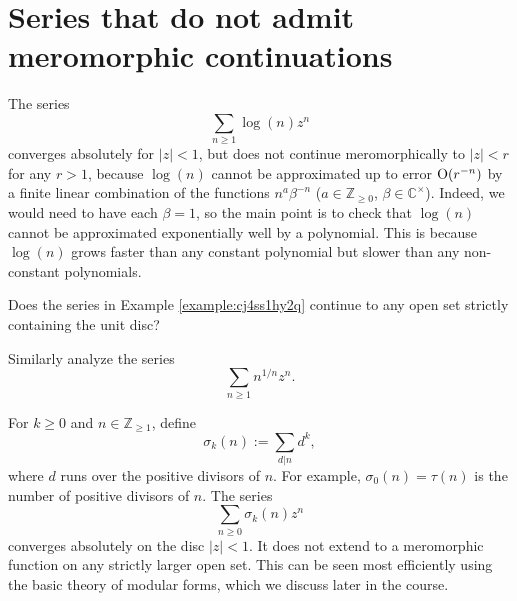 \documentclass[reqno]{amsart} 
\begin{document}
\section{Series that do not admit meromorphic continuations}\label{sec:cj4unj06mw}
\begin{example}\label{example:cj4ss1hy2q}
  The series
  \begin{equation*}
    \sum_{n \geq 1} \log(n) z^n
  \end{equation*}
  converges absolutely for $\lvert z \rvert < 1$, but does not continue meromorphically to $|z| < r$ for any $r > 1$, because $\log(n)$ cannot be approximated up to error $\operatorname{O}(r^{-n})$ by a finite linear combination of the functions $n^a \beta^{-n}$ ($a \in \mathbb{Z}_{\geq 0}$, $\beta \in \mathbb{C}^\times$).  Indeed, we would need to have each $\beta = 1$, so the main point is to check that $\log(n)$ cannot be approximated exponentially well by a polynomial.  This is because $\log(n)$ grows faster than any constant polynomial but slower than any non-constant polynomials.
\end{example}
\begin{question}
  Does the series in Example \ref{example:cj4ss1hy2q} continue to any open set strictly containing the unit disc?
\end{question}
\begin{exercise}
  Similarly analyze the series
  \begin{equation*}
    \sum_{n \geq 1} n^{1 / n} z^n.
  \end{equation*}
\end{exercise}
\begin{example}
  For $k \geq 0$ and $n \in \mathbb{Z}_{\geq 1}$, define
  \begin{equation*}
    \sigma_k(n) := \sum_{d | n} d^k,
  \end{equation*}
  where $d$ runs over the positive divisors of $n$.  For example, $\sigma_0(n) = \tau(n)$ is the number of positive divisors of $n$.  The series
  \begin{equation*}
    \sum_{n \geq 0} \sigma_k (n) z^n
  \end{equation*}
  converges absolutely on the disc $\lvert z \rvert < 1$.  It does not extend to a meromorphic function on any strictly larger open set.  This can be seen most efficiently using the basic theory of modular forms, which we discuss later in the course.
\end{example}


{} 
\end{document}
